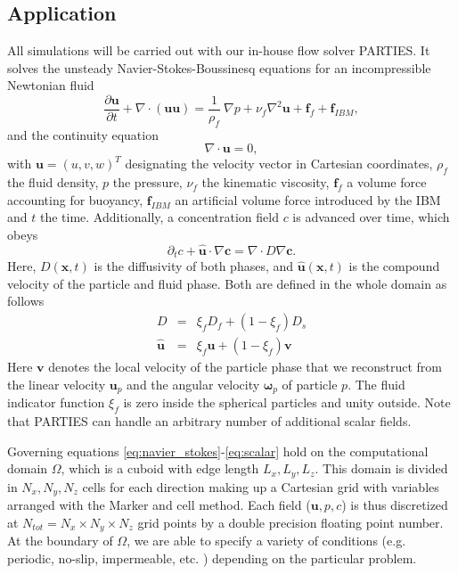 \documentclass[10pt]{article}
\newcommand{\bs}{\boldsymbol}
\begin{document}
\subsection*{Application}
All simulations  will be carried out with our in-house flow solver PARTIES.
It solves the unsteady Navier-Stokes-Boussinesq equations for an incompressible Newtonian fluid
\begin{equation} \label{eq:navier_stokes}
\frac{\partial{\textbf{u}}}{\partial{t}}+\nabla\cdot(\textbf{u}\textbf{u}) = \frac{1}{\rho_f}\:\nabla p + \nu_f \nabla^2 \textbf{u} + \textbf{f}_f + \textbf{f}_{IBM},
\end{equation} 
and the continuity equation
% 
\begin{equation}\label{eq:continuity}
\nabla\cdot\textbf{u}=0 ,
\end{equation}
with $\textbf{u}=(u,v,w)^{T}$ designating the velocity vector in Cartesian coordinates, $\rho_f$ the fluid density, $p$ the pressure, $\nu_f$ the kinematic viscosity, $\textbf{f}_f$ a volume force accounting for buoyancy, $\textbf{f}_{IBM}$ an artificial volume force introduced by the IBM and $t$ the time. Additionally, a concentration field  $c$ is advanced over time, which obeys   \\
 
 \begin{equation}
\partial_t  c + \hat {\mathbf u} \cdot \nabla \mathbf c=   \nabla \cdot  D \nabla \mathbf c. \label{eq:scalar}
\end{equation}
Here,  $D(\mathbf x, t)$ is  the diffusivity of both phases, and $\hat {\mathbf u}(\mathbf x, t)$  is the compound  velocity of the particle and fluid phase. Both are  defined in the whole domain as follows
\begin{eqnarray}
D &=& \xi_f D_f +(1-\xi_f)D_s  \\
\hat{ \mathbf u}  &=& \xi_f \mathbf u  + (1 - \xi_f ) \mathbf v
\end{eqnarray}
Here $\mathbf v$ denotes the local velocity of the particle phase that we reconstruct from the linear velocity $\mathbf u_p$ and the angular velocity $\bs \omega_p$ of particle $p$.
The fluid indicator function $\xi_f$ is zero inside the spherical particles  and unity outside.  Note that PARTIES can handle an arbitrary number of additional scalar fields. 

Governing equations \eqref{eq:navier_stokes}-\eqref{eq:scalar} hold on the  computational domain $\Omega$, which is a cuboid with edge length $L_x,L_y,L_z$. This domain is  divided in $N_x, N_y, N_z$  cells  for each direction making up a Cartesian grid with variables arranged with the Marker and cell method\citep{ferziger2012computational}. Each field ($\mathbf u,p,c$) is thus discretized at $N_{tot}=N_x\times N_y\times N_z$ grid points by a double precision floating point number. At the boundary of $\Omega$, we are able to specify a variety of conditions (e.g. periodic, no-slip, impermeable, etc. ) depending on the particular problem.
\end{document}
